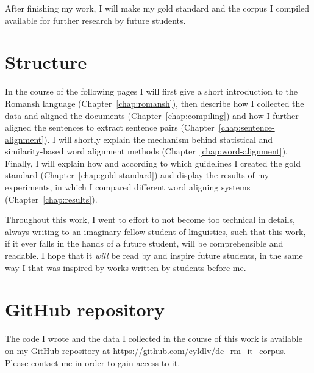 After finishing my work, I will make my gold standard and the corpus I compiled available for further research by future students.

\section{Structure}
In the course of the following pages I will first give a short introduction to the Romansh language (Chapter~\ref{chap:romansh}), then describe how I collected the data and aligned the documents (Chapter~\ref{chap:compiling}) and how I further aligned the sentences to extract sentence pairs (Chapter~\ref{chap:sentence-alignment}). 
I will shortly explain the mechanism behind statistical and similarity-based word alignment methods (Chapter~\ref{chap:word-alignment}). 
Finally, I will explain how and according to which guidelines I created the gold standard (Chapter~\ref{chap:gold-standard}) and display the results of my experiments, in which I compared different word aligning systems (Chapter~\ref{chap:results}).

Throughout this work, I went to effort to not become too technical in details, always writing to an imaginary fellow  student of linguistics, such that this work, if it ever falls in the hands of a future student, will be comprehensible and readable. 
I hope that it \emph{will} be read by and inspire future students, in the same way I that was inspired by works written by students before me.

\section{GitHub repository}
The code I wrote and the data I collected in the course of this work is available on my GitHub repository at \url{https://github.com/eyldlv/de_rm_it_corpus}. 
Please contact me in order to gain access to it.


